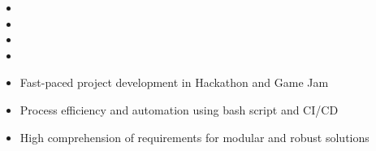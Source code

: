 \bigskip


\begin{itemize}
\item[\faCommentsO] 
\item[\faCommentsO] 
\item[\faCommentsO] 
\item[\faCommentsO] \par
\end{itemize}

\bigskip
\medskip



\begin{itemize}
	\item[\faAngleRight] Fast-paced project development in Hackathon and Game Jam
	\item[\faAngleRight] Process efficiency and automation using bash script and CI/CD
	\item[\faAngleRight] High comprehension of requirements for modular and robust solutions \par
\end{itemize}

\smallskip
\divider

\hfill
{}\hfill
{}\par
\smallskip
{}\hfill
{}\hfill
{}\hfill
{}\par
